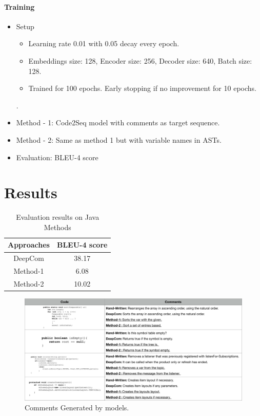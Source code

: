 \documentclass{tudelftposter}
\begin{document}


\paragraph{Training}
\begin{itemize}
    \item Setup
    \begin{itemize}
        \item Learning rate 0.01 with 0.05 decay every epoch.
        \item Embeddings size: 128, Encoder size: 256, Decoder size: 640, Batch size: 128.
        \item Trained for 100 epochs. Early stopping if no improvement for 10 epochs. 
    \end{itemize}.  
    \item Method - 1: Code2Seq model with comments as target sequence.
    \item Method - 2: Same as method 1 but with variable names in ASTs.
    \item Evaluation: BLEU-4 score
\end{itemize}
\section{Results} 
\begin{table}[H]
\centering
\begin{tabular}{cc}
\hline
Approaches & BLEU-4 score \\ \hline
DeepCom & 38.17 \\
Method-1 & 6.08 \\
Method-2 & 10.02 \\ \hline
\end{tabular}
\caption{Evaluation results on Java Methods}
\label{tab:bleu-table}
\end{table}

\begin{figure}[H]
    \centering
    \includegraphics[width =\linewidth]{img/results_table.png}
    \caption{Comments Generated by models.}
    \label{fig:comments_gen}
\end{figure}
\end{document}

